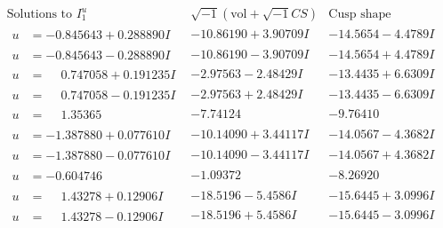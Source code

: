 \documentclass[1p]{elsarticle_modified}
\theoremstyle{definition}
\newcommand{\I}{\sqrt{-1}}
\begin{document}
$$\begin{array}{c|c|c}  
\text{Solutions to }I^u_{1}& \I (\text{vol} + \sqrt{-1}CS) & \text{Cusp shape}\\
 \hline 
\begin{aligned}
u &= -0.845643 + 0.288890 I\end{aligned}
 & -10.86190 + 3.90709 I & -14.5654 - 4.4789 I \\ \hline\begin{aligned}
u &= -0.845643 - 0.288890 I\end{aligned}
 & -10.86190 - 3.90709 I & -14.5654 + 4.4789 I \\ \hline\begin{aligned}
u &= \phantom{-}0.747058 + 0.191235 I\end{aligned}
 & -2.97563 - 2.48429 I & -13.4435 + 6.6309 I \\ \hline\begin{aligned}
u &= \phantom{-}0.747058 - 0.191235 I\end{aligned}
 & -2.97563 + 2.48429 I & -13.4435 - 6.6309 I \\ \hline\begin{aligned}
u &= \phantom{-}1.35365\phantom{ +0.000000I}\end{aligned}
 & -7.74124\phantom{ +0.000000I} & -9.76410\phantom{ +0.000000I} \\ \hline\begin{aligned}
u &= -1.387880 + 0.077610 I\end{aligned}
 & -10.14090 + 3.44117 I & -14.0567 - 4.3682 I \\ \hline\begin{aligned}
u &= -1.387880 - 0.077610 I\end{aligned}
 & -10.14090 - 3.44117 I & -14.0567 + 4.3682 I \\ \hline\begin{aligned}
u &= -0.604746\phantom{ +0.000000I}\end{aligned}
 & -1.09372\phantom{ +0.000000I} & -8.26920\phantom{ +0.000000I} \\ \hline\begin{aligned}
u &= \phantom{-}1.43278 + 0.12906 I\end{aligned}
 & -18.5196 - 5.4586 I & -15.6445 + 3.0996 I \\ \hline\begin{aligned}
u &= \phantom{-}1.43278 - 0.12906 I\end{aligned}
 & -18.5196 + 5.4586 I & -15.6445 - 3.0996 I \\ \hline\begin{aligned}

\end{aligned}
\end{array}$$
\end{document}
